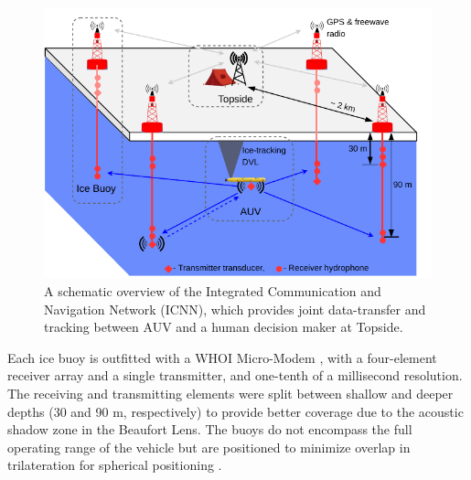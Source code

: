 \begin{figure}[h!]
	\centering
	\includegraphics[width=\reprintcolumnwidth]{figs/Fig2.pdf}
	\caption{A schematic overview of the Integrated Communication and Navigation Network (ICNN), which provides joint data-transfer and tracking between AUV and a human decision maker at Topside.}
	\label{fig:icnnOverview}
\end{figure}

Each ice buoy is outfitted with a WHOI Micro-Modem \citep{singh_underwater_2006}, with a four-element receiver array and a single transmitter, and one-tenth of a millisecond resolution.
The receiving and transmitting elements were split between shallow and deeper depths (30 and 90 m, respectively) to provide better coverage due to the acoustic shadow zone in the Beaufort Lens.
The buoys do not encompass the full operating range of the vehicle but are positioned to minimize overlap in trilateration for spherical positioning \citep{deffenbaugh_relationship_1996}.

